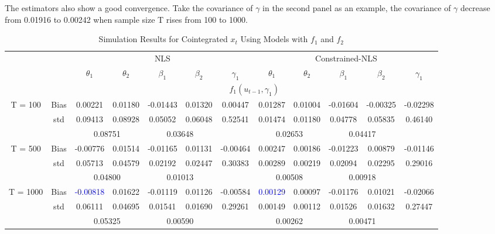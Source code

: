 \documentclass[a4paper,12pt,times,numbered,print,index]{report}
\numberwithin{equation}{section}
\begin{document}
The estimators also show a good convergence. Take the covariance of $\gamma$ in the second panel as an example, the covariance of $\gamma$ decrease from 0.01916 to 0.00242 when sample size T rises from 100 to 1000. 
\begin{table}[htbp]
  \centering
  \caption{Simulation Results for Cointegrated $x_t$ Using Models with $f_1$ and $f_2$}
    \begin{adjustbox}{max width=\textwidth}
    \begin{tabular}{cccccccccccc}
    \toprule
          &       & \multicolumn{5}{c}{NLS}               & \multicolumn{5}{c}{Constrained-NLS} \\
          &       & $\theta_1$ & $\theta_2$ & $\beta_1$ & $\beta_2$ & $\gamma_1$ & $\theta_1$ & $\theta_2$ & $\beta_1$ & $\beta_2$ & $\gamma_1$ \\
    \midrule
    &       & \multicolumn{10}{c}{$f_1 (u_{t-1}, \gamma_1)$}                \\
    \midrule
    \multirow{3}[1]{*}{T = 100} & Bias  & 0.00221 & 0.01180 & -0.01443 & 0.01320 & 0.00447 & 0.01287 & 0.01004 & -0.01604 & -0.00325 & -0.02298 \\
          & std   & 0.09413 & 0.08928 & 0.05052 & 0.06048 & 0.52541 & 0.01474 & 0.01180 & 0.04778 & 0.05835 & 0.46140 \\
          &       & \multicolumn{2}{c}{0.08751} & \multicolumn{2}{c}{0.03648} &       & \multicolumn{2}{c}{0.02653} & \multicolumn{2}{c}{0.04417} &  \\
    \multirow{3}[0]{*}{T = 500} & Bias  & -0.00776 & 0.01514 & -0.01165 & 0.01131 & -0.00464 & 0.00247 & 0.00186 & -0.01223 & 0.00879 & -0.01146 \\
          & std   & 0.05713 & 0.04579 & 0.02192 & 0.02447 & 0.30383 & 0.00289 & 0.00219 & 0.02094 & 0.02295 & 0.29016 \\
          &       & \multicolumn{2}{c}{0.04800} & \multicolumn{2}{c}{0.01013} &       & \multicolumn{2}{c}{0.00508} & \multicolumn{2}{c}{0.00918} &  \\
    \multirow{3}[1]{*}{T = 1000} & Bias  & \textcolor{blue}{-0.00818} & 0.01622 & -0.01119 & 0.01126 & -0.00584 & \textcolor{blue}{0.00129} & 0.00097 & -0.01176 & 0.01021 & -0.02066 \\
          & std   & 0.06111 & 0.04695 & 0.01541 & 0.01690 & 0.29261 & 0.00149 & 0.00112 & 0.01526 & 0.01632 & 0.27447 \\
          &       & \multicolumn{2}{c}{0.05325} & \multicolumn{2}{c}{0.00590} &       & \multicolumn{2}{c}{0.00262} & \multicolumn{2}{c}{0.00471} &  \\

\end{tabular}
\end{adjustbox}
\end{table}
\end{document}
